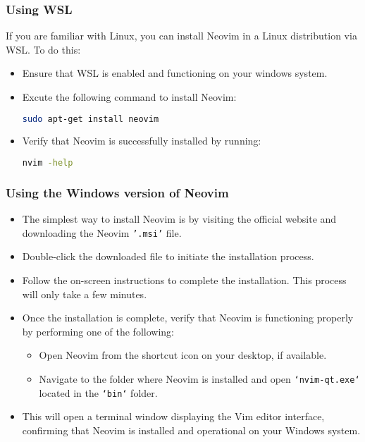 \documentclass[12pt, letterpaper]{article}
\begin{document}
\subsubsection{Using WSL}
If you are familiar with Linux, you can install Neovim in a Linux distribution via WSL. To do this:
\begin{itemize}
\item Ensure that WSL is enabled and functioning on your windows system.
\item Excute the following command to install Neovim: 
\begin{lstlisting}[language=bash,backgroundcolor=\color{codebackground} ]
sudo apt-get install neovim
\end{lstlisting}
\item Verify that Neovim is successfully installed by running:
\begin{lstlisting}[language=bash, backgroundcolor=\color{codebackground}] 
nvim -help 
\end{lstlisting}
\end{itemize}

\subsubsection{Using the Windows version of Neovim}
\begin{itemize}
  \item The simplest way to install Neovim is by visiting the official website and downloading the Neovim \texttt{'.msi'} file.
  \item Double-click the downloaded file to initiate the installation process.
  \item Follow the on-screen instructions to complete the installation. This process will only take a few minutes.
  \item Once the installation is complete, verify that Neovim is functioning properly by performing one of the following:
  \begin{itemize}
    \item Open Neovim from the shortcut icon on your desktop, if available.
    \item Navigate to the folder where Neovim is installed and open \texttt{`nvim-qt.exe`} located in the \texttt{`bin`} folder.
  \end{itemize}
  \item This will open a terminal window displaying the Vim editor interface, confirming that Neovim is installed and operational on your Windows system.
\end{itemize}
\end{document}
